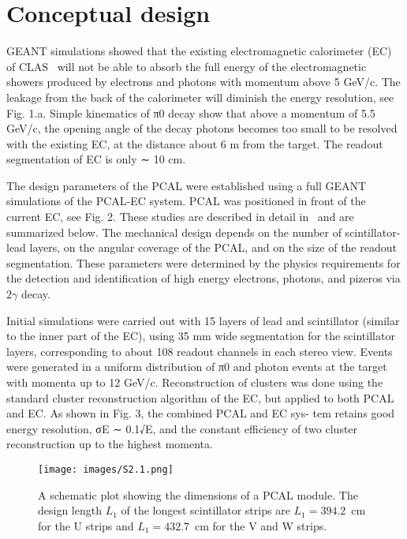 \section{Conceptual design}

GEANT simulations showed that the existing electromagnetic calorimeter (EC) of CLAS~\cite{clas6nsim} will not be able to absorb the full energy of the electromagnetic showers produced by electrons and photons with momentum above 5 GeV/c. The leakage from the back of the calorimeter will diminish the energy resolution, see Fig. 1.a. Simple kinematics of π0 decay show that above a momentum of 5.5 GeV/c, the opening angle of the decay photons becomes too small to be resolved with the existing EC, at the distance about 6 m from the target. The readout segmentation of EC is only ∼ 10 cm. 


The design parameters of the PCAL were established using a full GEANT simulations
of the PCAL-EC system. PCAL was positioned in front of the current EC, see Fig. 2. These
studies are described in detail in~\cite{2007001} and are summarized below. The mechanical design
depends on the number of scintillator-lead layers, on the angular coverage of the PCAL, and
on the size of the readout segmentation. These parameters were determined by the physics
requirements for the detection and identification of high energy electrons, photons, and pizeros
via $2\gamma$ decay.

Initial simulations were carried out with 15 layers of lead and scintillator (similar to the inner part of the EC), using 35 mm wide segmentation for the scintillator layers, corresponding to about 108 readout channels in each stereo view. Events were generated in a uniform distribution of π0 and photon events at the target with momenta up to 12 GeV/c. Reconstruction of clusters was done using the standard cluster reconstruction algorithm of the EC, but applied to both PCAL and EC. As shown in Fig. 3, the combined PCAL and EC sys- tem retains good energy resolution, σE ∼ 0.1√E, and the constant efficiency of two cluster reconstruction up to the highest momenta.

\begin{figure}
\centering
\texttt{[image: images/S2.1.png]}
\caption[A schematic plot of PCAL]{A schematic plot showing the dimensions of a PCAL module. The design length $L_1$ of the longest scintillator strips are $L_1=394.2$~cm for the U strips and $L_1=432.7$~cm for the V and W strips. }
\label{pcal-triangle}
\end{figure}

